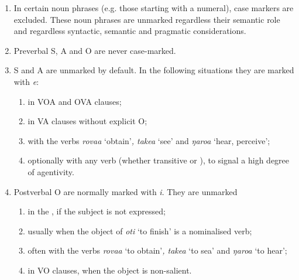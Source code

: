 \begin{enumerate}
\item 
In certain noun phrases (e.g. those starting with a numeral), case markers are excluded. These noun phrases are unmarked regardless their semantic role and regardless syntactic, semantic and pragmatic considerations.

\item 
Preverbal S, A and O are never case-marked.

\item 
S and A are unmarked by default. In the following situations they are marked with \textit{e}:

\begin{enumerate}
\item 
in VOA and OVA clauses;

\item 
in VA clauses without explicit O;

\item 
with the verbs \textit{rova{\ꞌ}a} ‘obtain’\textit{, take{\ꞌ}a} ‘see’ and \textit{ŋaro{\ꞌ}a} ‘hear, perceive’;

\item 
optionally with any  verb (whether transitive or ), to signal a high degree of agentivity.

\end{enumerate}
\item 
Postverbal O are normally marked with \textit{i}. They are unmarked

\begin{enumerate}
\item 
in the , if the subject is not expressed;

\item 
usually when the object of \textit{oti} ‘to finish’ is a nominalised verb;

\item 
often with the verbs \textit{rova{\ꞌ}a} ‘to obtain’\textit{, take{\ꞌ}a} ‘to sea’ and \textit{ŋaro{\ꞌ}a} ‘to hear’; 

\item 
in VO clauses, when the object is non-salient.

\end{enumerate}
\end{enumerate}
